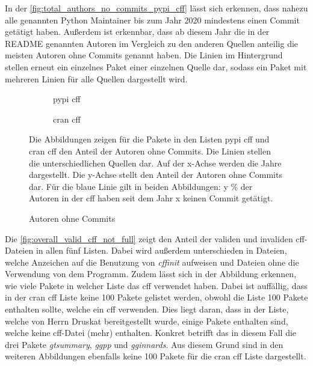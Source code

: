 In der \autoref{fig:total_authors_no_commits_pypi_cff} lässt sich erkennen, dass nahezu alle genannten Python Maintainer bis zum Jahr 2020 mindestens einen Commit getätigt haben.
Außerdem ist erkennbar, dass ab diesem Jahr die in der README genannten Autoren im Vergleich zu den anderen Quellen anteilig die meisten Autoren ohne Commits genannt haben.
Die Linien im Hintergrund stellen erneut ein einzelnes Paket einer einzelnen Quelle dar, sodass ein Paket mit mehreren Linien für alle Quellen dargestellt wird.

\begin{figure}
    \begin{subfigure}{.5\textwidth}
        \centering
        
        \caption{\gls{pypi} \gls{cff}}
        \label{fig:total_authors_no_commits_pypi_cff}
    \end{subfigure}%
    \begin{subfigure}{.5\textwidth}
        \centering
        
        \caption{\gls{cran} \gls{cff}}
        \label{fig:total_authors_no_commits_cran_cff}
    \end{subfigure}
    \caption{Autoren ohne Commits}
    \label{fig:total_authors_no_commits}
    \small
    Die Abbildungen zeigen für die Pakete in den Listen \gls{pypi} \gls{cff} und \gls{cran} \gls{cff} den Anteil der Autoren ohne Commits. Die Linien stellen die unterschiedlichen Quellen dar. Auf der x-Achse werden die Jahre dargestellt. Die y-Achse stellt den Anteil der Autoren ohne Commits dar. Für die blaue Linie gilt in beiden Abbildungen: y \% der Autoren in der \gls{cff} haben seit dem Jahr x keinen Commit getätigt.
\end{figure}

Die \autoref{fig:overall_valid_cff_not_full} zeigt den Anteil der validen und invaliden \gls{cff}-Dateien in allen fünf Listen.
Dabei wird außerdem unterschieden in Dateien, welche Anzeichen auf die Benutzung von \emph{cffinit} aufweisen und Dateien ohne die Verwendung von dem Programm.
Zudem lässt sich in der Abbildung erkennen, wie viele Pakete in welcher Liste das \gls{cff} verwendet haben.
Dabei ist auffällig, dass in der \gls{cran} \gls{cff} Liste keine 100 Pakete gelistet werden, obwohl die Liste 100 Pakete enthalten sollte, welche ein \gls{cff} verwenden.
Dies liegt daran, dass in der Liste, welche von Herrn Druskat bereitgestellt wurde, einige Pakete enthalten sind, welche keine \gls{cff}-Datei (mehr) enthalten.
Konkret betrifft das in diesem Fall die drei Pakete \emph{gtsummary}, \emph{ggpp} und \emph{gginnards}.
Aus diesem Grund sind in den weiteren Abbildungen ebenfalls keine 100 Pakete für die \gls{cran} \gls{cff} Liste dargestellt.

